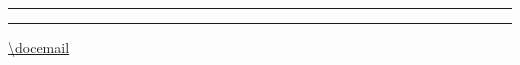 \begin{titlepage}
\renewcommand{\thepage}{C1}
\begin{center}

{\color{fav-red}\rule{\textwidth}{1pt}\par\medskip}
{\huge\bfseries\sffamily \doctitle \par\medskip}
{\color{fav-red}\rule{\textwidth}{1pt}\par\medskip}

\vspace{1cm}
{\Large\sffamily \scshape \docauthor \par}
\vspace{0.25cm}
{\url{\docemail} \par}

\vspace{1cm}

\vfill
{\docdate \par}
{\color{fav-purple}\large\itshape \docmotto \par}

\end{center}
\end{titlepage}

\ifx \doctoc \true
{}
{\sffamily\tableofcontents}
\clearpage
{}
\fi